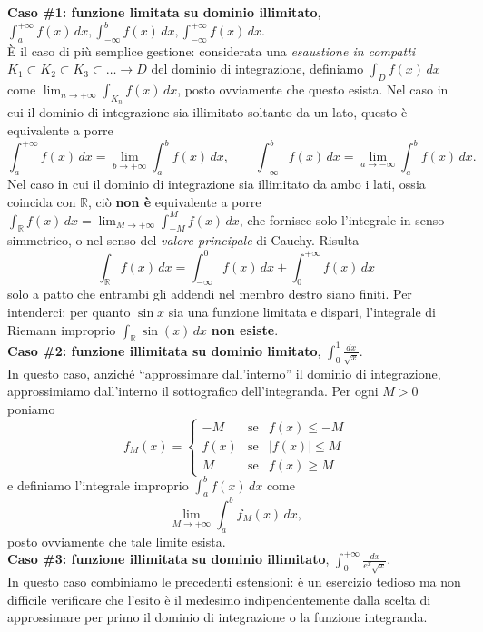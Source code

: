 \documentclass[a4paper,twoside]{article}
\newcommand{\R}{\mathbb{R}}
\theoremstyle{definition}
\numberwithin{theorem}{section}
\begin{document}
\textbf{Caso \#1: funzione limitata su dominio illimitato}, $\int_{a}^{+\infty}f(x)\,dx, \int_{-\infty}^{b}f(x)\,dx, \int_{-\infty}^{+\infty}f(x)\,dx.$\\
È il caso di più semplice gestione: considerata una \emph{esaustione in compatti} $K_1\subset K_2 \subset K_3 \subset \ldots \to D$ del dominio di integrazione, definiamo $\int_D f(x)\,dx$ come $\lim_{n\to +\infty}\int_{K_n}f(x)\,dx$, posto ovviamente che questo esista. Nel caso in cui il dominio di integrazione sia illimitato soltanto da un lato, questo è equivalente a porre
$$ \int_{a}^{+\infty}f(x)\,dx = \lim_{b\to +\infty}\int_{a}^{b}f(x)\,dx,\qquad \int_{-\infty}^{b}f(x)\,dx = \lim_{a\to -\infty}\int_{a}^{b}f(x)\,dx. $$
Nel caso in cui il dominio di integrazione sia illimitato da ambo i lati, ossia coincida con $\R$, ciò \textbf{non è} equivalente a porre $\int_{\R}f(x)\,dx = \lim_{M\to +\infty}\int_{-M}^{M}f(x)\,dx$, che fornisce solo l'integrale in senso simmetrico, o nel senso del \emph{valore principale} di Cauchy. Risulta 
$$ \int_{\R}f(x)\,dx = \int_{-\infty}^{0}f(x)\,dx + \int_{0}^{+\infty} f(x)\,dx $$
solo a patto che entrambi gli addendi nel membro destro siano finiti. Per intenderci: per quanto $\sin x$ sia una funzione limitata e dispari, l'integrale di Riemann improprio $\int_{\R}\sin(x)\,dx$ \textbf{non esiste}.\\

\textbf{Caso \#2: funzione illimitata su dominio limitato}, $\int_{0}^{1}\frac{dx}{\sqrt{x}}$.\\
In questo caso, anziché ``approssimare dall'interno'' il dominio di integrazione, approssimiamo dall'interno il sottografico dell'integranda. Per ogni $M>0$ poniamo
$$ f_M(x) = \left\{\begin{array}{rcl}-M &\text{se}& f(x)\leq -M \\ f(x) & \text{se} & |f(x)|\leq M \\ M &\text{se}& f(x)\geq M\end{array}\right. $$
e definiamo l'integrale improprio $\int_{a}^{b}f(x)\,dx$ come 
$$ \lim_{M\to +\infty} \int_{a}^{b} f_M(x)\,dx, $$
posto ovviamente che tale limite esista.\\

\textbf{Caso \#3: funzione illimitata su dominio illimitato}, $\int_{0}^{+\infty}\frac{dx}{e^x\sqrt{x}}$.\\
In questo caso combiniamo le precedenti estensioni: è un esercizio tedioso ma non difficile verificare che l'esito è il medesimo indipendentemente dalla scelta di approssimare per primo il dominio di integrazione o la funzione integranda.\\
\end{document}
